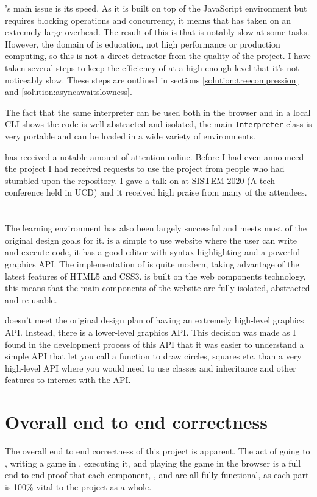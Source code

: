 \Setanta{}'s main issue is its speed. As it is built on top of the JavaScript environment but requires blocking operations and concurrency, it means that \Setanta{} has taken on an extremely large overhead. The result of this is that \Setanta{} is notably slow at some tasks. However, the domain of \Setanta{} is education, not high performance or production computing, so this is not a direct detractor from the quality of the project. I have taken several steps to keep the efficiency of \Setanta{} at a high enough level that it's not noticeably slow.
These steps are outlined in sections \ref{solution:treecompression} and \ref{solution:asyncawaitslowness}.

The fact that the same \Setanta{} interpreter can be used both in the browser and in a local CLI shows the code is well abstracted and isolated, the main \lstinline|Interpreter| class is very portable and can be loaded in a wide variety of environments.

\Setanta{} has received a notable amount of attention online. Before I had even announced the project I had received requests to use the project from people who had stumbled upon the repository. I gave a talk on \Setanta{} at SISTEM 2020 (A tech conference held in UCD) and it received high praise from many of the attendees.

\section{\trys{}}

The \trys{} learning environment has also been largely successful and meets most of the original design goals for it. \trys{} is a simple to use website where the user can write and execute \Setanta{} code, it has a good editor with syntax highlighting and a powerful graphics API.
The implementation of \trys{} is quite modern, taking advantage of the latest features of HTML5 and CSS3. \trys{} is built on the web components technology, this means that the main components of the \trys{} website are fully isolated, abstracted and re-usable.

\trys{} doesn't meet the original design plan of having an extremely high-level graphics API. Instead, there is a lower-level graphics API. This decision was made as I found in the development process of this API that it was easier to understand a simple API that let you call a function to draw circles, squares etc. than a very high-level API where you would need to use classes and inheritance and other features to interact with the API.

\section{Overall end to end correctness}

The overall end to end correctness of this project is apparent. The act of going to \trys{}, writing a game in \Setanta{}, executing it, and playing the game in the browser is a full end to end proof that each component, \trys{}, \Setanta{} and \tsPEG{} are all fully functional, as each part is 100\% vital to the project as a whole.
